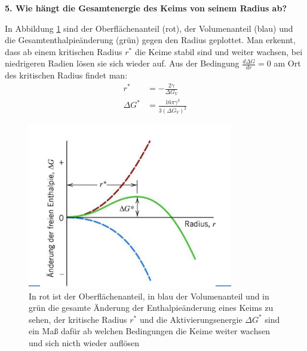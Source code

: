 \noindent\textbf{5. Wie hängt die Gesamtenergie des Keims von seinem Radius ab?}\\
\begin{addmargin}[25pt]{0pt}
In Abbildung \ref{fig:Enthalpie_Phasenumwandlung} sind der Oberflächenanteil (rot), der Volumenanteil (blau) und die Gesamtenthalpieänderung (grün) gegen den Radius geplottet. Man erkennt, dass ab einem kritischen Radius $r^*$ die Keime stabil sind und weiter wachsen, bei niedrigeren Radien lösen sie sich wieder auf. Aus der Bedingung $\frac{\si{d} \Delta G}{\si{d}r} = 0$ am Ort des kritischen Radius findet man:
\begin{align}\label{eq:kritischer_Radius}
    r^* &=-\frac{2\gamma}{\Delta G_V}\\\label{eq:Aktivierungsenergie}
    \Delta G^* &= \frac{16\pi\gamma^3}{3(\Delta G_V)^2}
\end{align}
\begin{figure}[h]
    \centering
    \includegraphics[width = 0.8\textwidth]{images/Materialwissenschaften/Enthalpie_Phasneumwandlung.jpeg}
    \caption{In rot ist der Oberflächenanteil, in blau der Volumenanteil und in grün die gesamte Änderung der Enthalpieänderung eines Keims zu sehen, der kritische Radius $r^*$ und die Aktivierungsenergie $\Delta G^*$ sind ein Maß dafür ab welchen Bedingungen die Keime weiter wachsen und sich nicth wieder auflösen}
    \label{fig:Enthalpie_Phasenumwandlung}
\end{figure}
\end{addmargin}

